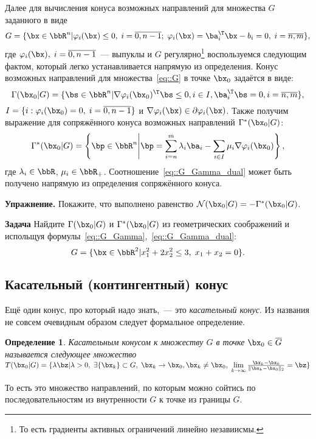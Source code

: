 \documentclass[12pt]{article}
\newtheorem{Def}{Определение}
\begin{document}
Далее для вычисления конуса возможных направлений для множества $G$ заданного в виде
\begin{equation}
G = \{ \bx \in \bbR^n | \varphi_i(\bx) \leq 0, \; i = \overline{0,n-1}; \; \varphi_i(\bx) = \ba_i^{\T}\bx - b_i = 0, \; i = \overline{n, m} \},
\label{eq::G}
\end{equation}
где $\varphi_i(\bx), \; i = \overline{0,n-1}$~--- выпуклы и $G$ регулярно\footnote{То есть градиенты активных ограничений линейно незавиисмы.} воспользуемся следующим фактом, который легко устанавливается напрямую из определения.
Конус возможных направлений для множества~\eqref{eq::G} в точке $\bx_0$ задаётся в виде:
\begin{equation}
\Gamma(\bx_0|G) = \{ \bs \in \bbR^n | \nabla \varphi_i(\bx_0)^{\T} \bs \leq 0, i \in I, \ba^{\T}_i \bs = 0, i = \overline{n,m} \},
\label{eq::G_Gamma}
\end{equation}
$I = \{i: \varphi_i(\bx_0) = 0, \; i = \overline{0,n-1}\}$ и $\nabla \varphi_i(\bx) \in \partial \varphi_i(\bx)$.
Также получим выражение для сопряжённого конуса возможных направлений $\Gamma^*(\bx_0|G)$:
\begin{equation}
\Gamma^*(\bx_0|G) = \left \{ \bp \in \bbR^n \middle\rvert \bp = \sum\limits_{i = n}^m \lambda_i\ba_i - \sum\limits_{i \in I} \mu_i \nabla\varphi_i(\bx_0) \right \},
\label{eq::G_Gamma_dual}
\end{equation} 
где $\lambda_i \in \bbR$, $\mu_i \in \bbR_+$.
Соотношение~\eqref{eq::G_Gamma_dual} может быть получено напрямую из определения сопряжённого конуса.

\textbf{Упражнение.} Покажите, что выполнено равенство $\mathcal{N}(\bx_0|G) = -\Gamma^*(\bx_0|G)$.

\textbf{Задача} Найдите $\Gamma(\bx_0|G)$ и $\Gamma^*(\bx_0|G)$ из геометрических соображений и испольщуя формулы~\eqref{eq::G_Gamma},~\eqref{eq::G_Gamma_dual}:
\[
G = \{ \bx \in \bbR^2 | x_1^2 + 2x_2^2 \leq 3, \; x_1 + x_2 = 0 \}.
\]

\subsection{Касательный (контингентный) конус}
Ещё один конус, про который надо знать,~--- это \emph{касательный конус}.
Из названия не совсем очевидным образом следует формальное определение.
\begin{Def}
Касательным конусом к множеству $G$ в точке $\bx_0 \in \overline{G}$ называется следующее множество $T(\bx_0 |G) = \{ \lambda \bz | \lambda > 0, \; \exists \{\bx_k\} \subset G, \; \bx_k \rightarrow \bx_0, \bx_k \neq \bx_0, \; \lim\limits_{k \rightarrow \infty} \frac{\bx_k - \bx_0}{\|\bx_k - \bx_0\|_2} = \bz \}$
\end{Def}
То есть это множество направлений, по которым можно сойтись по последовательностям из внутренности $G$ к точке из границы $G$.
\end{document}
